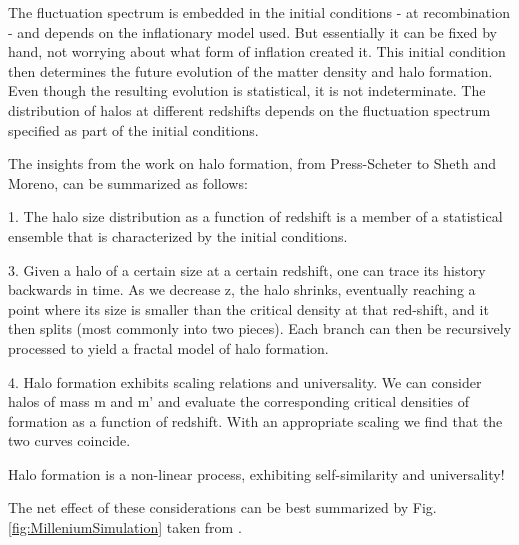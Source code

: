 
The fluctuation spectrum is embedded in the initial conditions - at recombination - and depends on the inflationary model used. But essentially it can be fixed by hand, not worrying about what form of inflation created it. This initial condition then determines the future evolution of the matter density and halo formation. Even though the resulting evolution is statistical, it is not indeterminate. The distribution of halos at different redshifts depends on the fluctuation spectrum specified as part of the initial conditions.

The insights from the work on halo formation, from Press-Scheter to Sheth and Moreno, can be summarized as follows:

1. The halo size distribution as a function of redshift is a member of a statistical ensemble that is characterized by the initial conditions.


3. Given a halo of a certain size at a certain redshift, one can trace its history backwards in time. As we decrease z, the halo shrinks, eventually reaching a point where its size is smaller than the critical density at that red-shift, and it then splits (most commonly into two pieces). Each branch can then be recursively processed to yield a fractal model of halo formation.

4. Halo formation exhibits scaling relations and universality. We can consider halos of mass m and m' and evaluate the corresponding critical densities of formation as a function of redshift. With an appropriate scaling we find that the two curves coincide.

Halo formation is a non-linear process, exhibiting self-similarity and universality!

The net effect of these considerations can be best summarized by Fig. \ref{fig:MilleniumSimulation} taken from \cite{Springel2006The-large-scale,Springel2005Simulating}.

